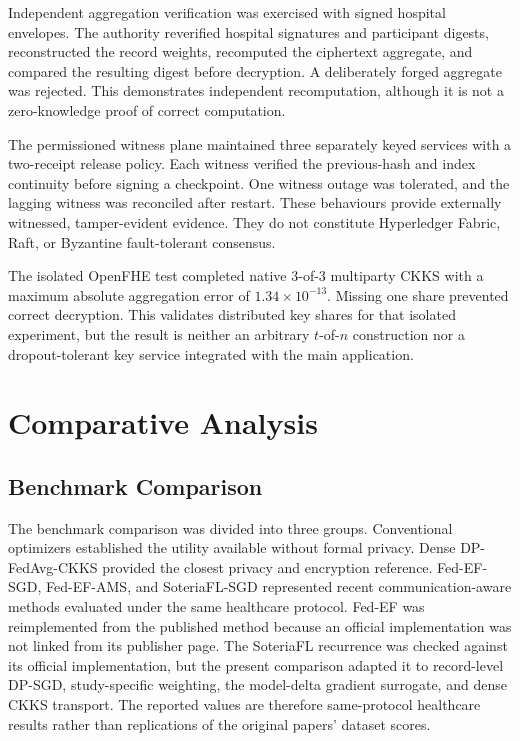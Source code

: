 Independent aggregation verification was exercised with signed hospital envelopes. The authority reverified hospital signatures and participant digests, reconstructed the record weights, recomputed the ciphertext aggregate, and compared the resulting digest before decryption. A deliberately forged aggregate was rejected. This demonstrates independent recomputation, although it is not a zero-knowledge proof of correct computation.

The permissioned witness plane maintained three separately keyed services with a two-receipt release policy. Each witness verified the previous-hash and index continuity before signing a checkpoint. One witness outage was tolerated, and the lagging witness was reconciled after restart. These behaviours provide externally witnessed, tamper-evident evidence. They do not constitute Hyperledger Fabric, Raft, or Byzantine fault-tolerant consensus.

The isolated OpenFHE test completed native 3-of-3 multiparty CKKS with a maximum absolute aggregation error of $1.34\times10^{-13}$. Missing one share prevented correct decryption. This validates distributed key shares for that isolated experiment, but the result is neither an arbitrary $t$-of-$n$ construction nor a dropout-tolerant key service integrated with the main application.

\section{Comparative Analysis}
\label{sec:results-comparative-analysis}

\subsection{Benchmark Comparison}
\label{subsec:benchmark-comparison}

The benchmark comparison was divided into three groups. Conventional optimizers established the utility available without formal privacy. Dense DP-FedAvg-CKKS provided the closest privacy and encryption reference. Fed-EF-SGD, Fed-EF-AMS, and SoteriaFL-SGD represented recent communication-aware methods evaluated under the same healthcare protocol. Fed-EF was reimplemented from the published method because an official implementation was not linked from its publisher page. The SoteriaFL recurrence was checked against its official implementation, but the present comparison adapted it to record-level DP-SGD, study-specific weighting, the model-delta gradient surrogate, and dense CKKS transport. The reported values are therefore same-protocol healthcare results rather than replications of the original papers' dataset scores.

